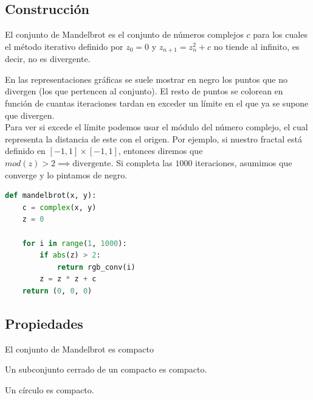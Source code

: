 \subsection{Construcción}

\begin{definition}
    El conjunto de Mandelbrot es el conjunto de números complejos $c$ para los cuales el método iterativo definido por $z_0 = 0$ y $z_{n+1} = z_n^2 + c$ no tiende al infinito, es decir, no es divergente.\cite{Medina_2011}
\end{definition}

\noindent En las representaciones gráficas se suele mostrar en negro los puntos que no divergen (los que pertencen al conjunto). El resto de puntos se colorean en función de cuantas iteraciones tardan en exceder un límite en el que ya se supone que divergen.\\

\noindent Para ver si excede el límite podemos usar el módulo del número complejo, el cual representa la distancia de este con el origen. Por ejemplo, si nuestro fractal está definido en $[-1,1] \times [-1,1]$, entonces diremos que $mod(z)>2 \implies \text{divergente}$.
Si completa las $1000$ iteraciones, asumimos que converge y lo pintamos de negro.\\

\begin{lstlisting}[language=Python]
def mandelbrot(x, y):
    c = complex(x, y)
    z = 0

    for i in range(1, 1000):
        if abs(z) > 2:
            return rgb_conv(i)
        z = z * z + c
    return (0, 0, 0)
\end{lstlisting}

\subsection{Propiedades}

\begin{theorem}
    El conjunto de Mandelbrot es compacto \cite{Wikipedia_Mandelbrot}
\end{theorem}

\begin{lemma}
    Un subconjunto cerrado de un compacto es compacto.
\end{lemma}

\begin{lemma}
    Un círculo es compacto.
\end{lemma}

